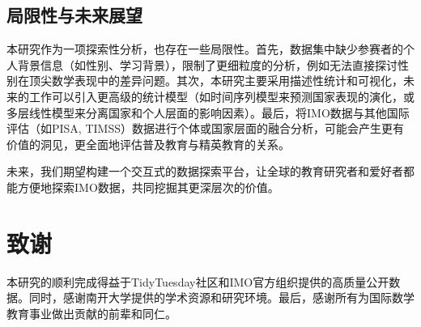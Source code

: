 \documentclass[12pt,a4paper]{article}
\begin{document}
\subsection{局限性与未来展望}
本研究作为一项探索性分析，也存在一些局限性。首先，数据集中缺少参赛者的个人背景信息（如性别、学习背景），限制了更细粒度的分析，例如无法直接探讨性别在顶尖数学表现中的差异问题\cite{gender_mathematics_performance}。其次，本研究主要采用描述性统计和可视化，未来的工作可以引入更高级的统计模型（如时间序列模型来预测国家表现的演化，或多层线性模型来分离国家和个人层面的影响因素）。最后，将IMO数据与其他国际评估（如PISA, TIMSS）数据进行个体或国家层面的融合分析，可能会产生更有价值的洞见，更全面地评估普及教育与精英教育的关系。

未来，我们期望构建一个交互式的数据探索平台，让全球的教育研究者和爱好者都能方便地探索IMO数据，共同挖掘其更深层次的价值。

\section{致谢}
本研究的顺利完成得益于TidyTuesday社区和IMO官方组织提供的高质量公开数据。同时，感谢南开大学提供的学术资源和研究环境。最后，感谢所有为国际数学教育事业做出贡献的前辈和同仁。

\clearpage
{}
{}
\renewcommand{\bibname}{参考文献}

\end{document}

